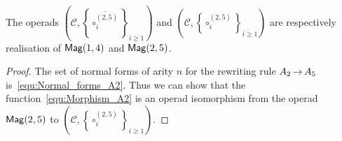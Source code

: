\begin{Proposition} \label{prop:Realisation_Mag_1_4}
The operads 
$\left(\mathcal{C}, \left\{\overline{\circ_i^{(2,5)}}\right\}_{i \geq 1}
\right)$ and 
$\left(\mathcal{C}, \left\{\circ_i^{(2,5)}\right\}_{i \geq 1}\right)$ 
are respectively realisation of $\mathsf{Mag}(1,4)$ and $\mathsf{Mag}(2,5)$.
\end{Proposition}

\begin{proof}
The set of normal forms of arity $n$ for the rewriting rule 
$A_2 \operatorname{\to} A_5$ is~\eqref{equ:Normal_forms_A2}. Thus we can show that
 the function~\eqref{equ:Morphism_A2}
is an operad isomorphism from the operad $\mathsf{Mag}(2,5)$ to 
$\left(\mathcal{C}, \left\{\circ_i^{(2,5)}\right\}_{i \geq 1}\right)$. 
\end{proof}

